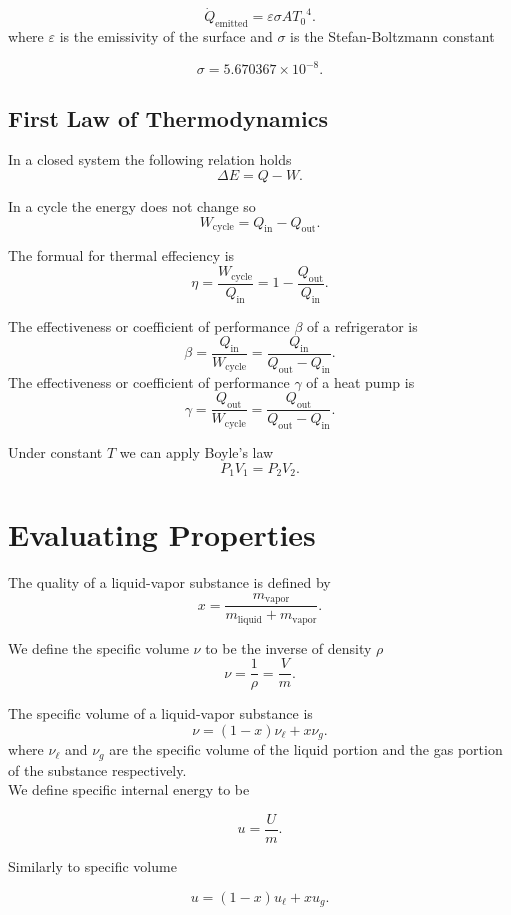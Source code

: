 \documentclass{report}
\begin{document}
\[
	\dot{Q}_\text{emitted} = \varepsilon\sigma A{T_0}^4
	.\]
where $\varepsilon$ is the emissivity of the surface and $\sigma$ is the Stefan-Boltzmann constant

\[
	\sigma = 5.670367 \times 10^{−8}
	.\]

\section{First Law of Thermodynamics}

In a closed system the following relation holds
\[
	\Delta E = Q - W
	.\]

In a cycle the energy does not change so
\[
	W_\text{cycle} = Q_\text{in} - Q_\text{out}
	.\]

The formual for thermal effeciency is
\[
	\eta = \frac{W_\text{cycle}}{Q_\text{in}} = 1-\frac{Q_\text{out}}{Q_\text{in}}
	.\]

The effectiveness or coefficient of performance $\beta$ of a refrigerator is
\[
	\beta = \frac{Q_\text{in}}{W_\text{cycle}} = \frac{Q_\text{in}}{Q_\text{out} - Q_\text{in}}
	.\]
The effectiveness or coefficient of performance $\gamma$ of a heat pump is
\[
	\gamma = \frac{Q_\text{out}}{W_\text{cycle}} = \frac{Q_\text{out}}{Q_\text{out} - Q_\text{in}}
	.\]

Under constant $T$ we can apply Boyle's law
\[
	P_1V_1 = P_2V_2
	.\]

\chapter{Evaluating Properties} %

The quality of a liquid-vapor substance is defined by
\[
	x=\frac{m_\text{vapor}}{m_\text{liquid} + m_\text{vapor}}
	.\]

We define the specific volume $\nu$ to be the inverse of density $\rho$
\[
	\nu = \frac{1}{\rho}=\frac{V}{m}
	.\]

The specific volume of a liquid-vapor substance is
\[
	\nu = (1-x)\nu_\ell + x\nu_g
	.\]
where $\nu_\ell$ and $\nu_g$ are the specific volume of the liquid portion and the gas portion of the substance respectively.\\

We define specific internal energy to be

\[
	u = \frac{U}{m}
	.\]

Similarly to specific volume

\[
	u = (1-x)u_\ell + xu_g
	.\]
\end{document}
